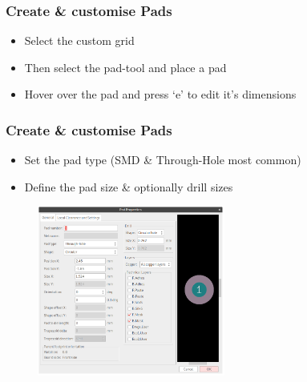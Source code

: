 \documentclass{beamer}
\begin{document}
\begin{frame}
  \frametitle{Create \& customise Pads}
  \begin{itemize}
    \item Select the custom grid
    \item Then select the pad-tool and place a pad
    \item Hover over the pad and press `e' to edit it's dimensions
  \end{itemize}
\end{frame}


\begin{frame}
  \frametitle{Create \& customise Pads}
  \begin{itemize}
    \item Set the pad type (SMD \& Through-Hole most common)
    \item Define the pad size \& optionally drill sizes
  \end{itemize}
  \begin{figure}[H]
    \centering
    \includegraphics[width=0.55\textwidth]{images/step_05.png}
  \end{figure}
\end{frame}
\end{document}
